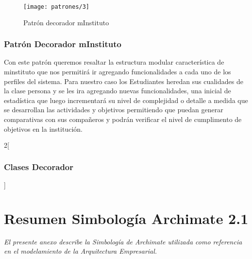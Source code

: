   \begin{figure}[H]
	\centering
	\texttt{[image: patrones/3]}
	\captionsetup{width=.95\textwidth}
	\caption{Patrón decorador mInstituto \cite{ref9,ref6}}
	\label{patron2}
  \end{figure}

  \subsection{Patrón Decorador mInstituto}
  Con este patrón queremos resaltar la estructura modular característica de minstituto que nos permitirá ir agregando funcionalidades a cada uno de los perfiles del sistema. Para nuestro caso los Estudiantes heredan sus cualidades de la clase persona y se les ira agregando nuevas funcionalidades, una inicial de estadística que luego incrementará su nivel de complejidad o detalle a medida que se desarrollan las actividades y objetivos permitiendo que puedan generar comparativas con sus compañeros y podrán verificar el nivel de cumplimento de objetivos en la institución.

\begin{multicols}{2}[\subsection{Clases Decorador}]
	
	
	
	
	
\end{multicols}

\chapter{Resumen Simbología Archimate 2.1}
\label{apex:anexos}
\textit{El presente anexo describe la Simbología de Archimate utilizada como referencia en el modelamiento de la Arquitectura Empresarial.}
\vfill
\minitoc
\cleardoublepage

